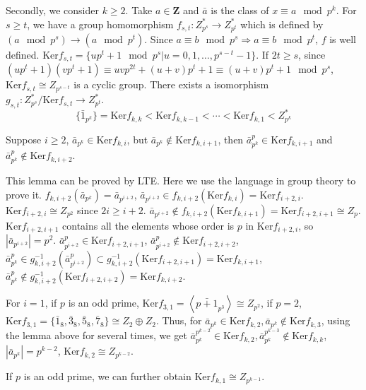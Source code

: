 \begin{answer}
    Secondly, we consider $k\geq 2$. Take $a\in\mathbf{Z}$ and $\bar{a}$ is the class of $x\equiv a\mod p^{k}$. For $s\geq t$, we have a group homomorphism $f_{s,t}:Z_{p^{s}}^{*}\to Z_{p^{t}}^{*}$ which is defined by $(a \mod p^{s})\to (a\mod p^{t})$. Since $a\equiv b\mod p^{s}\Rightarrow a\equiv b\mod p^{t}$, $f$ is well defined. $\mathrm{Ker}f_{s,t}=\{up^{t}+1\mod p^{s}|u=0,1,\dots,p^{s-t}-1\}$. If $2t\geq s$, since $(up^{t}+1)(vp^{t}+1)\equiv uvp^{2t}+(u+v)p^{t}+1\equiv (u+v)p^{t}+1\mod p^{s}$, $\mathrm{Ker}f_{s,t}\cong Z_{p^{s-t}}$ is a cyclic group. There exists a isomorphism $g_{s,t}:Z_{p^{s}}^{*}/\mathrm{Ker}f_{s,t}\to Z_{p^{t}}^{*}$. \[\{\bar{1}_{p^{k}}\}=\mathrm{Ker}f_{k,k}<\mathrm{Ker}f_{k,k-1}<\cdots<\mathrm{Ker}f_{k,1}<Z_{p^{k}}^{*}\] 
    \begin{lemma}
        Suppose $i\geq 2$, $\bar{a}_{p^{k}}\in\mathrm{Ker}f_{k,i}$, but $\bar{a}_{p^{k}}\notin \mathrm{Ker}f_{k,i+1}$, then $\bar{a}_{p^{k}}^{p}\in \mathrm{Ker}f_{k,i+1}$ and $\bar{a}_{p^{k}}^{p}\notin \mathrm{Ker}f_{k,i+2}$.
    \end{lemma}
    This lemma can be proved by LTE. Here we use the language in group theory to prove it. $f_{k,i+2}(\bar{a}_{p^{k}})=\bar{a}_{p^{i+2}}$, $\bar{a}_{p^{i+2}}\in f_{k,i+2}(\mathrm{Ker}f_{k,i})=\mathrm{Ker}f_{i+2,i}$. $\mathrm{Ker}f_{i+2,i}\cong Z_{p^{2}}$ since $2i\geq i+2$. $\bar{a}_{p^{i+2}}\notin f_{k,i+2}(\mathrm{Ker}f_{k,i+1})=\mathrm{Ker}f_{i+2,i+1}\cong Z_{p}$. $\mathrm{Ker}f_{i+2,i+1}$ contains all the elements whose order is $p$ in $\mathrm{Ker}f_{i+2,i}$, so $\left| \bar{a}_{p^{i+2}} \right| =p^{2}$. $\bar{a}_{p^{i+2}}^{p}\in \mathrm{Ker}f_{i+2,i+1}$, $\bar{a}_{p^{i+2}}^{p}\notin \mathrm{Ker}f_{i+2,i+2}$, $\bar{a}_{p^{k}}^{p}\in g_{k,i+2}^{-1}(\bar{a}_{p^{i+2}}^{p})\subset g_{k,i+2}^{-1}(\mathrm{Ker}f_{i+2,i+1})=\mathrm{Ker}f_{k,i+1}$, $\bar{a}_{p^{k}}^{p}\notin g_{k,i+2}^{-1}(\mathrm{Ker}f_{i+2,i+2})=\mathrm{Ker}f_{k,i+2}$.

    For $i=1$, if $p$ is an odd prime, $\mathrm{Ker}f_{3,1}=\left\langle\bar{p+1}_{p^{3}}\right\rangle\cong Z_{p^{2}}$, if $p=2$, $\mathrm{Ker}f_{3,1}=\{\bar{1}_{8},\bar{3}_{8},\bar{5}_{8},\bar{7}_{8}\}\cong Z_{2}\oplus Z_{2}$. Thus, for $\bar{a}_{p^{k}}\in\mathrm{Ker}f_{k,2}, \bar{a}_{p^{k}}\notin \mathrm{Ker}f_{k,3}$, using the lemma above for several times, we get $\bar{a}_{p^{k}}^{p^{k-2}}\in\mathrm{Ker}f_{k,2},\bar{a}_{p^{k}}^{p^{k-3}}\notin\mathrm{Ker}f_{k,k}$, $\left| \bar{a}_{p^{k}} \right|=p^{k-2} $, $\mathrm{Ker}f_{k,2}\cong Z_{p^{k-2}}$.

    If $p$ is an odd prime, we can further obtain $\mathrm{Ker}f_{k,1}\cong Z_{p^{k-1}}$.


\end{answer}
